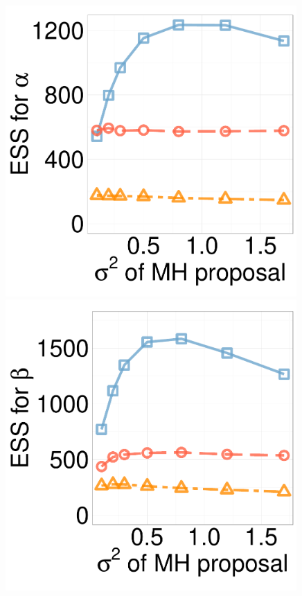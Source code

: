 \begin{figure}[H]
\begin{minipage}[hp]{0.24\linewidth}
	\end{minipage}
  \centering
  \begin{minipage}[!hp]{0.24\linewidth}
  \centering
    \includegraphics [width=0.99\textwidth, angle=0]{figs/ess/EXP_D3alpha_k2.pdf}
\end{minipage}
  \begin{minipage}[hp]{0.24\linewidth}
  \centering
    \includegraphics [width=0.99\textwidth, angle=0]{figs/ess/EXP_D3beta_k2.pdf}

\end{minipage}
\end{figure}

